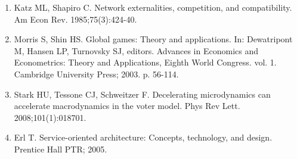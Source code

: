 \documentclass[10pt,letterpaper]{article}
\begin{document}
\begin{enumerate}
\item Katz ML, Shapiro C.
Network externalities, competition, and compatibility.
Am Econ Rev. 1985;75(3):424-40.

\item Morris S, Shin HS.
Global games: Theory and applications.
In: Dewatripont M, Hansen LP, Turnovsky SJ, editors. Advances in
  Economics and Econometrics: Theory and Applications, Eighth World Congress.
  vol. 1. Cambridge University Press; 2003. p. 56-114.

\item Stark HU, Tessone CJ, Schweitzer F.
Decelerating microdynamics can accelerate macrodynamics in the voter
  model.
Phys Rev Lett. 2008;101(1):018701.

\item Erl T.
Service-oriented architecture: Concepts, technology, and design.
Prentice Hall PTR; 2005.

\end{enumerate}
\end{document}
